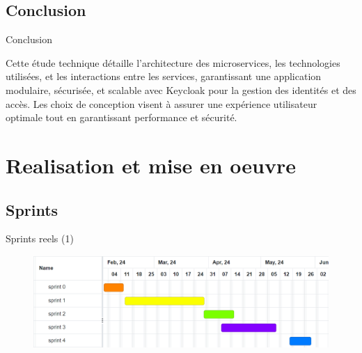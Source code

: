 \documentclass{beamer}
\begin{document}
\subsection{Conclusion}
\begin{frame}{Conclusion}

    Cette étude technique détaille l'architecture des microservices, les technologies utilisées, et les interactions entre les services, garantissant une application modulaire, sécurisée, et scalable avec Keycloak pour la gestion des identités et des accès. Les choix de conception visent à assurer une expérience utilisateur optimale tout en garantissant performance et sécurité.
\end{frame}

\section{Realisation et mise en oeuvre}


\subsection{Sprints}
\begin{frame}{Sprints reels (1)}
 
    \begin{figure}[htpb]
           \centering
           \includegraphics[height=3.5cm]{pic/gantt-reel.png}
       \end{figure}
   \end{frame}
\end{document}
